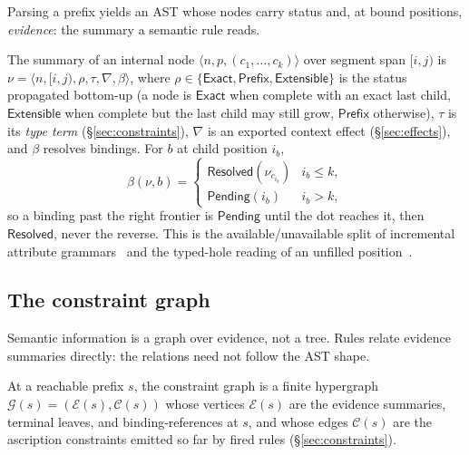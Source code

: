 Parsing a prefix yields an AST whose nodes carry status and, at bound positions,
\emph{evidence}: the summary a semantic rule reads.

\begin{definition}
  \label{def:evidence}
  The summary of an internal node $\langle n, p, (c_1,\dots,c_k)\rangle$ over
  segment span $[i,j)$ is $\nu = \langle n, [i,j), \rho, \tau, \nabla,
  \beta\rangle$, where $\rho \in \{\mathsf{Exact}, \mathsf{Prefix},
  \mathsf{Extensible}\}$ is the status propagated bottom-up (a node is
  $\mathsf{Exact}$ when complete with an exact last child, $\mathsf{Extensible}$
  when complete but the last child may still grow, $\mathsf{Prefix}$ otherwise),
  $\tau$ is its \emph{type term} (\S\ref{sec:constraints}), $\nabla$ is an
  exported context effect (\S\ref{sec:effects}), and $\beta$ resolves bindings.
  For $b$ at child position $i_b$,
  \[
    \beta(\nu, b) =
    \begin{cases}
      \mathsf{Resolved}(\nu_{c_{i_b}}) & i_b \le k, \\
      \mathsf{Pending}(i_b)            & i_b > k,
    \end{cases}
  \]
  so a binding past the right frontier is $\mathsf{Pending}$ until the dot
  reaches it, then $\mathsf{Resolved}$, never the reverse. This is the
  available/unavailable split of incremental attribute
  grammars~\cite{demers1981incremental} and the typed-hole reading of an unfilled
  position~\cite{omar2017hazelnut}.
\end{definition}

\subsection{The constraint graph}
\label{sec:graph}

Semantic information is a graph over evidence, not a tree. Rules relate evidence
summaries directly: the relations need not follow the AST shape.

\begin{definition}
  \label{def:constraint-graph}
  At a reachable prefix $s$, the constraint graph is a finite hypergraph
  $\mathcal{G}(s) = (\mathcal{E}(s), \mathcal{C}(s))$ whose vertices
  $\mathcal{E}(s)$ are the evidence summaries, terminal leaves, and
  binding-references at $s$, and whose edges $\mathcal{C}(s)$ are the ascription
  constraints emitted so far by fired rules (\S\ref{sec:constraints}).
\end{definition}

